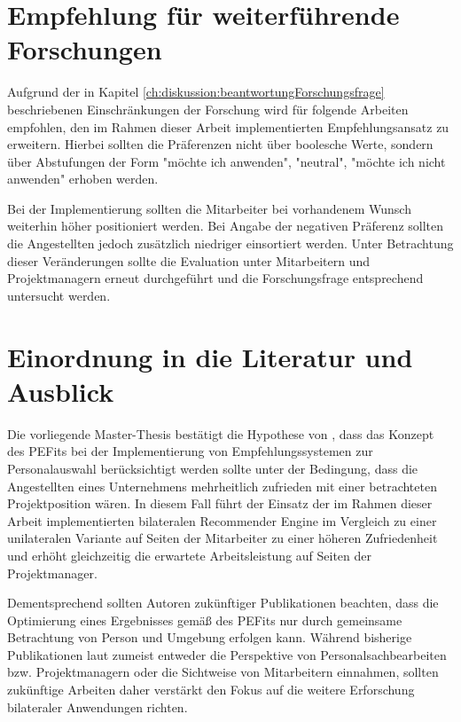 \section{Empfehlung für weiterführende Forschungen}
\label{ch:diskussion:empfehlung}
Aufgrund der in Kapitel \ref{ch:diskussion:beantwortungForschungsfrage} beschriebenen Einschränkungen der Forschung wird für folgende Arbeiten empfohlen, den im Rahmen dieser Arbeit implementierten Empfehlungsansatz zu erweitern. Hierbei sollten die Präferenzen nicht über boolesche Werte, sondern über Abstufungen der Form "möchte ich anwenden", "neutral", "möchte ich nicht anwenden" erhoben werden.

Bei der Implementierung sollten die Mitarbeiter bei vorhandenem Wunsch weiterhin höher positioniert werden. Bei Angabe der negativen Präferenz sollten die Angestellten jedoch zusätzlich niedriger einsortiert werden. Unter Betrachtung dieser Veränderungen sollte die Evaluation unter Mitarbeitern und Projektmanagern erneut durchgeführt und die Forschungsfrage entsprechend untersucht werden.

\section{Einordnung in die Literatur und Ausblick}
\label{ch:diskussion:einordnung}
Die vorliegende Master-Thesis bestätigt die Hypothese von \textcite{malinowski:2008}, dass das Konzept des \acp{PEFit} bei der Implementierung von Empfehlungssystemen zur Personalauswahl berücksichtigt werden sollte unter der Bedingung, dass die Angestellten eines Unternehmens mehrheitlich zufrieden mit einer betrachteten Projektposition wären. In diesem Fall führt der Einsatz der im Rahmen dieser Arbeit implementierten bilateralen Recommender Engine im Vergleich zu einer unilateralen Variante auf Seiten der Mitarbeiter zu einer höheren Zufriedenheit und erhöht gleichzeitig die erwartete Arbeitsleistung auf Seiten der Projektmanager.

Dementsprechend sollten Autoren zukünftiger Publikationen beachten, dass die Optimierung eines Ergebnisses gemäß des \acp{PEFit} nur durch gemeinsame Betrachtung von Person und Umgebung erfolgen kann. Während bisherige Publikationen laut \textcite{malinowski:2008} zumeist entweder die Perspektive von Personalsachbearbeiten bzw. Projektmanagern oder die Sichtweise von Mitarbeitern einnahmen, sollten zukünftige Arbeiten daher verstärkt den Fokus auf die weitere Erforschung bilateraler Anwendungen richten.
